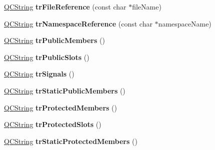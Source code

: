 \begin{DoxyCompactItemize}
\item 
\mbox{\label{class_translator_slovene_aa73ebddc140799f209c16c106b24bb4e}} 
\mbox{\hyperlink{class_q_c_string}{Q\+C\+String}} {\bfseries tr\+File\+Reference} (const char $\ast$file\+Name)
\item 
\mbox{\label{class_translator_slovene_a3d3cfeb920abafff5b80907234994e6b}} 
\mbox{\hyperlink{class_q_c_string}{Q\+C\+String}} {\bfseries tr\+Namespace\+Reference} (const char $\ast$namespace\+Name)
\item 
\mbox{\label{class_translator_slovene_aca9b9f14caa5392b7ad94ea5b4b924fd}} 
\mbox{\hyperlink{class_q_c_string}{Q\+C\+String}} {\bfseries tr\+Public\+Members} ()
\item 
\mbox{\label{class_translator_slovene_af9487f073db060ecbd591f52aca55a6a}} 
\mbox{\hyperlink{class_q_c_string}{Q\+C\+String}} {\bfseries tr\+Public\+Slots} ()
\item 
\mbox{\label{class_translator_slovene_a6c7147bfb4d5d10b00c6c421a56e3257}} 
\mbox{\hyperlink{class_q_c_string}{Q\+C\+String}} {\bfseries tr\+Signals} ()
\item 
\mbox{\label{class_translator_slovene_aae683b1e928f9efb486e501bbf2f34a1}} 
\mbox{\hyperlink{class_q_c_string}{Q\+C\+String}} {\bfseries tr\+Static\+Public\+Members} ()
\item 
\mbox{\label{class_translator_slovene_a10143caecb134468c800bb13b8984367}} 
\mbox{\hyperlink{class_q_c_string}{Q\+C\+String}} {\bfseries tr\+Protected\+Members} ()
\item 
\mbox{\label{class_translator_slovene_a5dcbb82b020fb8d149f3fc468d95ebd7}} 
\mbox{\hyperlink{class_q_c_string}{Q\+C\+String}} {\bfseries tr\+Protected\+Slots} ()
\item 
\mbox{\label{class_translator_slovene_a26abf8514da38c39061334d295e36a2a}} 
\mbox{\hyperlink{class_q_c_string}{Q\+C\+String}} {\bfseries tr\+Static\+Protected\+Members} ()
\item 

\end{DoxyCompactItemize}
